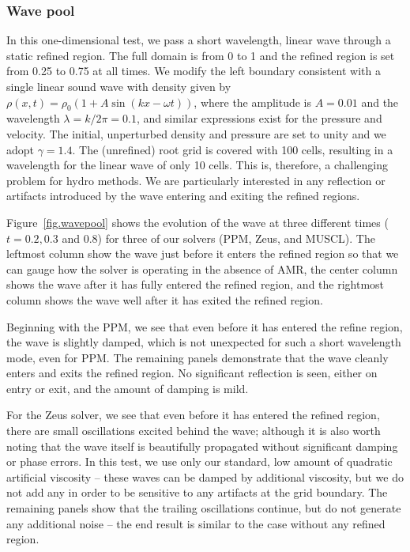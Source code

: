 \subsubsection{Wave pool}
\label{sec.tests.wavepool}

In this one-dimensional test, we pass a short wavelength, linear wave through a static refined region.  The full domain is from 0 to 1 and the refined region is set from 0.25 to 0.75 at all times.  We modify the left boundary consistent with a single linear sound wave with density given by $\rho(x,t) = \rho_0 (1 + A \sin(kx - \omega t))$, where the amplitude is $A = 0.01$ and the wavelength $\lambda = k/2\pi = 0.1$, and similar expressions exist for the pressure and velocity.  The initial, unperturbed density and pressure are set to unity and we adopt $\gamma = 1.4$.  The (unrefined) root grid is covered with 100 cells, resulting in a wavelength for the linear wave of only 10 cells.  This is, therefore, a challenging problem for hydro methods.  We are particularly interested in any reflection or artifacts introduced by the wave entering and exiting the refined regions.

Figure~\ref{fig.wavepool} shows the evolution of the wave at three different times ($t = 0.2, 0.3$ and 0.8) for three of our solvers (PPM, Zeus, and MUSCL).  The leftmost column show the wave just before it enters the refined region so that we can gauge how the solver is operating in the absence of AMR, the center column shows the wave after it has fully entered the refined region, and the rightmost column shows the wave well after it has exited the refined region.

Beginning with the PPM, we see that even before it has entered the refine region, the wave is slightly damped, which is not unexpected for such a short wavelength mode, even for PPM.  The remaining panels demonstrate that the wave cleanly enters and exits the refined region.  No significant reflection is seen, either on entry or exit, and the amount of damping is mild.

For the Zeus solver, we see that even before it has entered the refined region, there are small oscillations excited behind the wave; although it is also worth noting that the wave itself is beautifully propagated without significant damping or phase errors.  In this test, we use only our standard, low amount of quadratic artificial viscosity -- these waves can be damped by additional viscosity, but we do not add any in order to be sensitive to any artifacts at the grid boundary.  The remaining panels show that the trailing oscillations continue, but do not generate any additional noise -- the end result is similar to the case without any refined region.

